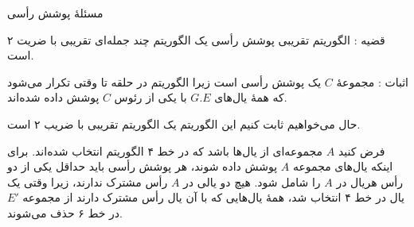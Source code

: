 \begin{itemframe}{‌مسئلهٔ پوشش رأسی}
\item[\textbullet]
قضیه : الگوریتم تقریبی پوشش رأسی یک الگوریتم چند جمله‌ای تقریبی با ضریت ۲ است.
\item[\textbullet]
اثبات : مجموعهٔ
$C$
یک پوشش رأسی است زیرا الگوریتم در حلقه تا وقتی تکرار می‌شود که همهٔ یال‌های
$G.E$
با یکی از رئوس
$C$
پوشش داده شده‌اند.
\item[\textbullet]
حال می‌خواهیم ثابت کنیم این الگوریتم یک الگوریتم تقریبی با ضریب ۲ است.
\item[\textbullet]
فرض کنید
$A$
مجموعه‌ای از یال‌ها باشد که در خط ۴ الگوریتم انتخاب شده‌اند. برای اینکه یال‌های مجموعه
$A$
پوشش داده شوند، هر پوشش رأسی باید حداقل یکی از دو رأس هریال در
$A$
را شامل شود. هیچ دو یالی در
$A$
رأس مشترک ندارند، زیرا وقتی یک یال در خط ۴ انتخاب شد، همهٔ یال‌هایی که با آن یال رأس مشترک دارند از مجموعه
$E'$
در خط ۶ حذف می‌شوند.
\end{itemframe}
\iffalse
\begin{itemframe}{‌مسئلهٔ پوشش رأسی}
\itm
بنابراین هیچ دویالی در
$A$
با یک رأس از
$C^*$
پوشش داده نشده‌اند و این بدین معنی است که به ازای هر رأس در
$C^*$
، حداکثر یک یال در
$A$
وجود دارد و بنابراین داریم :
\begin{align*}
$|C^*| \geqslant |A|$
\end{align*}
\itm
هر اجرای خط ۴ یک یال را انتخاب \می‌کند که هیچ‌کدام از دو رأس مجاور آن در
$C$
نیستند و بنابراین داریم :
\begin{align*}
$|C| = 2 |A|$
\end{align*}
\itm
با استفاده از دو رابطهٔ به دست آمده خواهیم داشت :
\begin{align*}
$|C| = 2 |A| \leqslant 2|C^*|$
\end{align*}
و قضیه بدین ترتیب اثبات می‌شود.
\end{itemframe}
\fi